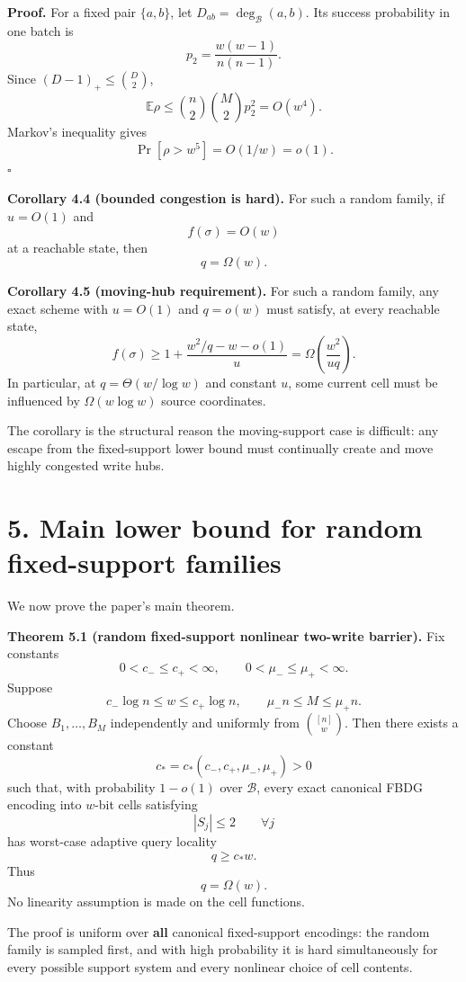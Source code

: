 \documentclass[
]{article}
\begin{document}
\textbf{Proof.} For a fixed pair \(\{a,b\}\), let
\(D_{ab}=\deg_{\mathcal B}(a,b)\). Its success probability in one batch
is \[
p_2=\frac{w(w-1)}{n(n-1)}.
\] Since \((D-1)_+\le\binom D2\), \[
\mathbb E\rho
\le
\binom n2\binom M2p_2^2
=O(w^4).
\] Markov's inequality gives \[
\Pr[\rho>w^5]=O(1/w)=o(1).
\] \(\square\)

\textbf{Corollary 4.4 (bounded congestion is hard).} For such a random
family, if \(u=O(1)\) and \[
f(\sigma)=O(w)
\] at a reachable state, then \[
q=\Omega(w).
\]

\textbf{Corollary 4.5 (moving-hub requirement).} For such a random
family, any exact scheme with \(u=O(1)\) and \(q=o(w)\) must satisfy, at
every reachable state, \[
f(\sigma)
\ge
1+
\frac{w^2/q-w-o(1)}{u}
=
\Omega\!\left(\frac{w^2}{uq}\right).
\] In particular, at \(q=\Theta(w/\log w)\) and constant \(u\), some
current cell must be influenced by \(\Omega(w\log w)\) source
coordinates.

The corollary is the structural reason the moving-support case is
difficult: any escape from the fixed-support lower bound must
continually create and move highly congested write hubs.

\hypertarget{main-lower-bound-for-random-fixed-support-families}{%
\section{5. Main lower bound for random fixed-support
families}\label{main-lower-bound-for-random-fixed-support-families}}

We now prove the paper's main theorem.

\textbf{Theorem 5.1 (random fixed-support nonlinear two-write barrier).}
Fix constants \[
0<c_-\le c_+<\infty,
\qquad
0<\mu_-\le\mu_+<\infty.
\] Suppose \[
c_-\log n\le w\le c_+\log n,
\qquad
\mu_-n\le M\le\mu_+n.
\] Choose \(B_1,\ldots,B_M\) independently and uniformly from
\(\binom{[n]}w\). Then there exists a constant \[
c_*=c_*(c_-,c_+,\mu_-,\mu_+)>0
\] such that, with probability \(1-o(1)\) over \(\mathcal B\), every
exact canonical FBDG encoding into \(w\)-bit cells satisfying \[
|S_j|\le2\qquad\forall j
\] has worst-case adaptive query locality \[
q\ge c_*w.
\] Thus \[
\boxed{q=\Omega(w)}.
\] No linearity assumption is made on the cell functions.

The proof is uniform over \textbf{all} canonical fixed-support
encodings: the random family is sampled first, and with high probability
it is hard simultaneously for every possible support system and every
nonlinear choice of cell contents.
\end{document}
